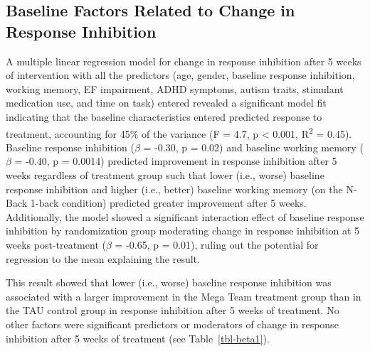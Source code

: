 \documentclass[
  letterpaper,
]{ut-thesis}
\begin{document}
\subsection{Baseline Factors Related to Change in Response
Inhibition}\label{baseline-factors-related-to-change-in-response-inhibition}

A multiple linear regression model for change in response inhibition
after 5 weeks of intervention with all the predictors (age, gender,
baseline response inhibition, working memory, EF impairment, ADHD
symptoms, autism traits, stimulant medication use, and time on task)
entered revealed a significant model fit indicating that the baseline
characteristics entered predicted response to treatment, accounting for
45\% of the variance (F = 4.7, p \textless{} 0.001, R\textsuperscript{2}
= 0.45). Baseline response inhibition (\(\beta\) = -0.30, p = 0.02) and
baseline working memory (\(\beta\) = -0.40, p = 0.0014) predicted
improvement in response inhibition after 5 weeks regardless of treatment
group such that lower (i.e., worse) baseline response inhibition and
higher (i.e., better) baseline working memory (on the N-Back 1-back
condition) predicted greater improvement after 5 weeks. Additionally,
the model showed a significant interaction effect of baseline response
inhibition by randomization group moderating change in response
inhibition at 5 weeks post-treatment (\(\beta\) = -0.65, p = 0.01),
ruling out the potential for regression to the mean explaining the
result.

This result showed that lower (i.e., worse) baseline response inhibition
was associated with a larger improvement in the Mega Team treatment
group than in the TAU control group in response inhibition after 5 weeks
of treatment. No other factors were significant predictors or moderators
of change in response inhibition after 5 weeks of treatment (see
Table~\ref{tbl-beta1}).
\end{document}
